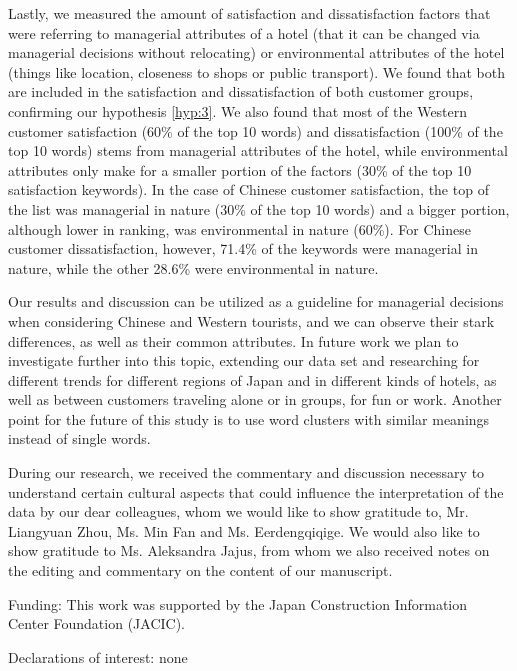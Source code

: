 Lastly, we measured the amount of satisfaction and dissatisfaction factors that were referring to managerial attributes of a hotel (that it can be changed via managerial decisions without relocating) or environmental attributes of the hotel (things like location, closeness to shops or public transport). We found that both are included in the satisfaction and dissatisfaction of both customer groups, confirming our hypothesis \ref{hyp:3}. We also found that most of the Western customer satisfaction (60\% of the top 10 words) and dissatisfaction (100\% of the top 10 words) stems from managerial attributes of the hotel, while environmental attributes only make for a smaller portion of the factors (30\% of the top 10 satisfaction keywords). In the case of Chinese customer satisfaction, the top of the list was managerial in nature (30\% of the top 10 words) and a bigger portion, although lower in ranking, was environmental in nature (60\%). For Chinese customer dissatisfaction, however, 71.4\% of the keywords were managerial in nature, while the other 28.6\% were environmental in nature.

Our results and discussion can be utilized as a guideline for managerial decisions when considering Chinese and Western tourists, and we can observe their stark differences, as well as their common attributes. In future work we plan to investigate further into this topic, extending our data set and researching for different trends for different regions of Japan and in different kinds of hotels, as well as between customers traveling alone or in groups, for fun or work. Another point for the future of this study is to use word clusters with similar meanings instead of single words. 

\begin{acknowledgements}

During our research, we received the commentary and discussion necessary to understand certain cultural aspects that could influence the interpretation of the data by our dear colleagues, whom we would like to show gratitude to, Mr. Liangyuan Zhou, Ms. Min Fan and Ms. Eerdengqiqige. We would also like to show gratitude to Ms. Aleksandra Jajus, from whom we also received notes on the editing and commentary on the content of our manuscript.

\medskip

Funding: This work was supported by the Japan Construction Information Center Foundation (JACIC).

\medskip

Declarations of interest: none

\end{acknowledgements}

